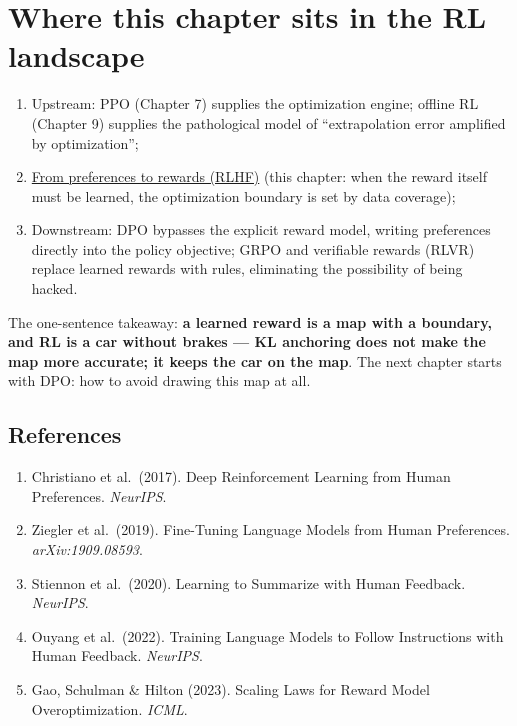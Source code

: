 \documentclass{article}
\begin{document}
\section*{Where this chapter sits in the RL landscape}

\begin{enumerate}
  \item Upstream: PPO (Chapter 7) supplies the optimization engine; offline RL (Chapter 9) supplies the pathological model of ``extrapolation error amplified by optimization'';
  \item \underline{From preferences to rewards (RLHF)} (this chapter: when the reward itself must be learned, the optimization boundary is set by data coverage);
  \item Downstream: DPO bypasses the explicit reward model, writing preferences directly into the policy objective; GRPO and verifiable rewards (RLVR) replace learned rewards with rules, eliminating the possibility of being hacked.
\end{enumerate}

The one-sentence takeaway: \textbf{a learned reward is a map with a boundary, and RL is a car without brakes --- KL anchoring does not make the map more accurate; it keeps the car on the map}. The next chapter starts with DPO: how to avoid drawing this map at all.

\subsection*{References}

\begin{enumerate}
  \item Christiano et al.\ (2017). Deep Reinforcement Learning from Human Preferences. \textit{NeurIPS}.
  \item Ziegler et al.\ (2019). Fine-Tuning Language Models from Human Preferences. \textit{arXiv:1909.08593}.
  \item Stiennon et al.\ (2020). Learning to Summarize with Human Feedback. \textit{NeurIPS}.
  \item Ouyang et al.\ (2022). Training Language Models to Follow Instructions with Human Feedback. \textit{NeurIPS}.
  \item Gao, Schulman \& Hilton (2023). Scaling Laws for Reward Model Overoptimization. \textit{ICML}.
\end{enumerate}
\end{document}
